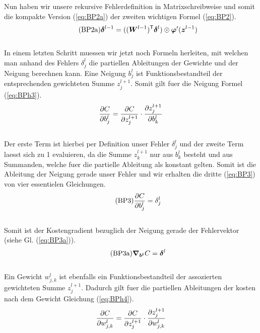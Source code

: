Nun haben wir unsere rekursive Fehlerdefinition in Matrixschreibweise und somit
die kompakte Version (\ref{eq:BP2a}) der zweiten wichtigen Formel (\ref{eq:BP2}).
\\
\begin{equation}\tag{BP2a}\label{eq:BP2a}
  \bm{\delta}^{l-1} = ((\bm{W}^{l-1})^{\mathsf{T}} \bm{\delta}^l) \odot \bm{\varphi}'(\bm{z}^{l-1})
\end{equation}
\\
In einem letzten Schritt muessen wir jetzt noch Formeln herleiten, mit welchen
man anhand des Fehlers $\delta_j^l$ die partiellen Ableitungen der Gewichte und
der Neigung berechnen kann.
\para{}
Eine Neigung $b_j^l$ ist Funktionsbestandteil der entsprechenden gewichteten
Summe $z_j^{l+1}$. Somit gilt fuer die Neigung Formel (\ref{eq:BPh3}).
\\
\begin{equation}\label{eq:BPh3}
  \frac{\partial C}{\partial b_j^l} = \frac{\partial C}{\partial z_j^{l+1}} \cdot \frac{\partial z_j^{l+1}}{\partial b_k^l}
\end{equation}
\\
Der erste Term ist hierbei per Definition unser Fehler $\delta_j^l$ und der
zweite Term laesst sich zu 1 evaluieren, da die Summe $z_k^{l+1}$ nur aus
$b_k^l$ besteht und aus Summanden, welche fuer die partielle Ableitung als konstant gelten.
Somit ist die Ableitung der Neigung gerade unser Fehler und wir erhalten die
dritte (\ref{eq:BP3}) von vier essentielen Gleichungen.
\\
\begin{equation}\tag{BP3}\label{eq:BP3}
  \frac{\partial C}{\partial b_j^l} = \delta_j^l
\end{equation}
\\
Somit ist der Kostengradient bezuglich der Neigung gerade der Fehlervektor
(siehe Gl. (\ref{eq:BP3a})).
\\
\begin{equation}\tag{BP3a}\label{eq:BP3a}
  \bm{\nabla}_{\bm{b^l}} C =  \bm{\delta}^l
\end{equation}
\\
Ein Gewicht $w_{j,k}^l$ ist ebenfalls ein Funktionsbestandteil der assozierten
gewichteten Summe $z_j^{l+1}$. Dadurch gilt fuer die partiellen Ableitungen der
kosten nach dem Gewicht Gleichung (\ref{eq:BPh4}).
\\
\begin{equation}\label{eq:BPh4}
  \frac{\partial C}{\partial w_{j,k}^l} = \frac{\partial C}{\partial z_j^{l+1}} \cdot \frac{\partial z_j^{l+1}}{\partial w_{j,k}^l}
\end{equation}
